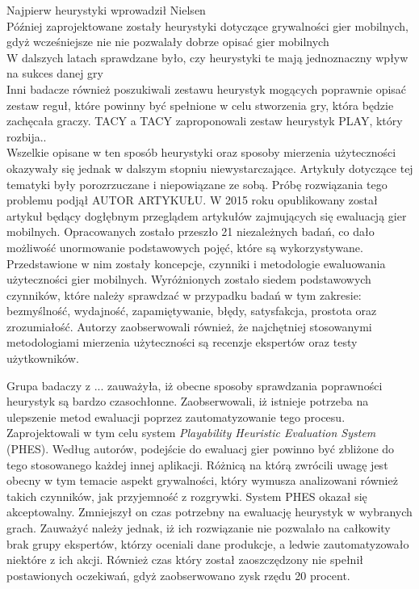 \documentclass[a4paper,12pt,numbers=noenddot]{report}
\begin{document}
Najpierw heurystyki wprowadził Nielsen \cite{art_Nielsen}\\

Później zaprojektowane zostały heurystyki dotyczące grywalności gier mobilnych, gdyż wcześniejsze nie nie pozwalały dobrze opisać gier mobilnych \cite{art_playabilityHeuristics}\\

W dalszych latach sprawdzane było, czy heurystyki  te mają jednoznaczny wpływ na sukces danej gry \cite{art_evaluationOfMG}\\

Inni badacze również poszukiwali zestawu heurystyk mogących poprawnie opisać zestaw reguł, które powinny być spełnione w celu stworzenia gry, która będzie zachęcała graczy. TACY a TACY zaproponowali zestaw heurystyk PLAY, który rozbija.. \cite{ArticlePLAY}\\

Wszelkie opisane w ten sposób heurystyki oraz sposoby mierzenia użyteczności okazywały się jednak w dalszym stopniu niewystarczające. Artykuły dotyczące tej tematyki były porozrzuczane i niepowiązane ze sobą. Próbę rozwiązania tego problemu podjął AUTOR ARTYKUŁU. W 2015 roku opublikowany został artykuł będący dogłębnym przeglądem artykułów zajmujących się ewaluacją gier mobilnych. \cite{art_UsabilityEvaluationSystematicReview} Opracowanych zostało przeszło 21 niezależnych badań, co dało możliwość unormowanie podstawowych pojęć, które są wykorzystywane. Przedstawione w nim zostały koncepcje, czynniki i metodologie ewaluowania użyteczności gier mobilnych. Wyróżnionych zostało siedem podstawowych czynników, które należy sprawdzać w przypadku badań w tym zakresie: bezmyślność, wydajność, zapamiętywanie, błędy, satysfakcja, prostota oraz zrozumiałość. Autorzy zaobserwowali również, że najchętniej stosowanymi metodologiami mierzenia użyteczności są recenzje ekspertów oraz testy użytkowników.

Grupa badaczy z ... zauważyła, iż obecne sposoby sprawdzania poprawności heurystyk są bardzo czasochłonne. \cite{art_evaluationOfMGevaluationSystem} Zaobserwowali, iż istnieje potrzeba na ulepszenie metod ewaluacji poprzez zautomatyzowanie tego procesu. Zaprojektowali w tym celu system \textit{Playability Heuristic Evaluation System} (PHES). Według autorów, podejście do ewaluacj gier powinno być zbliżone do tego stosowanego każdej innej aplikacji. Różnicą na którą zwrócili uwagę jest obecny w tym temacie aspekt grywalności, który wymusza analizowani również takich czynników, jak przyjemność z rozgrywki. System PHES okazał się akceptowalny. Zmniejszył on czas potrzebny na ewaluację heurystyk w wybranych grach. Zauważyć należy jednak, iż ich rozwiązanie nie pozwalało na całkowity brak grupy ekspertów, którzy oceniali dane produkcje, a ledwie zautomatyzowało niektóre z ich akcji. Również czas który został zaoszczędzony nie spełnił postawionych oczekiwań, gdyż zaobserwowano zysk rzędu 20 procent.
\end{document}
